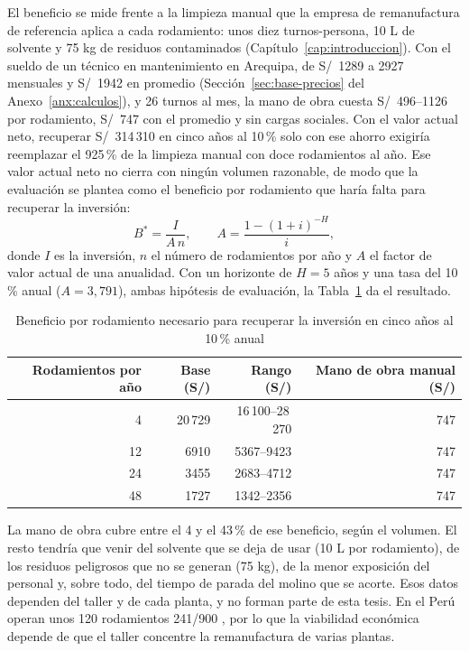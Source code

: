 El beneficio se mide frente a la limpieza manual que la empresa de remanufactura de referencia aplica a cada rodamiento: unos diez turnos-persona, 10 L de solvente y 75 kg de residuos contaminados (Capítulo~\ref{cap:introduccion}). Con el sueldo de un técnico en mantenimiento en Arequipa, de S/~1289 a 2927 mensuales y S/~1942 en promedio (Sección~\ref{sec:base-precios} del Anexo~\ref{anx:calculos}), y 26 turnos al mes, la mano de obra cuesta S/~496--1126 por rodamiento, S/~747 con el promedio y sin cargas sociales. Con el valor actual neto, recuperar S/~314\,310 en cinco años al 10\,\% solo con ese ahorro exigiría reemplazar el 925\,\% de la limpieza manual con doce rodamientos al año. Ese valor actual neto no cierra con ningún volumen razonable, de modo que la evaluación se plantea como el beneficio por rodamiento que haría falta para recuperar la inversión:
\begin{equation}
  B^{*}=\frac{I}{A\,n},\qquad A=\frac{1-(1+i)^{-H}}{i},
  \label{eq:beneficio-requerido}
\end{equation}
donde $I$ es la inversión, $n$ el número de rodamientos por año y $A$ el factor de valor actual de una anualidad. Con un horizonte de $H=5$ años y una tasa del 10\,\% anual ($A=3{,}791$), ambas hipótesis de evaluación, la Tabla~\ref{tab:beneficio-requerido} da el resultado.

\begin{table}[htbp]
\centering\small\singlespacing
\caption{Beneficio por rodamiento necesario para recuperar la inversión en cinco años al 10\,\% anual}
\label{tab:beneficio-requerido}
\begin{tabular}{@{}rrrr@{}}
\toprule
\textbf{Rodamientos por año} & \textbf{Base (S/)} & \textbf{Rango (S/)} & \textbf{Mano de obra manual (S/)}\\
\midrule
4 & 20\,729 & 16\,100--28\,270 & 747\\
12 & 6910 & 5367--9423 & 747\\
24 & 3455 & 2683--4712 & 747\\
48 & 1727 & 1342--2356 & 747\\
\bottomrule
\end{tabular}
\end{table}

La mano de obra cubre entre el 4 y el 43\,\% de ese beneficio, según el volumen. El resto tendría que venir del solvente que se deja de usar (10 L por rodamiento), de los residuos peligrosos que no se generan (75 kg), de la menor exposición del personal y, sobre todo, del tiempo de parada del molino que se acorte. Esos datos dependen del taller y de cada planta, y no forman parte de esta tesis. En el Perú operan unos 120 rodamientos 241/900 \cite{taller_ingeniero_2026}, por lo que la viabilidad económica depende de que el taller concentre la remanufactura de varias plantas.

